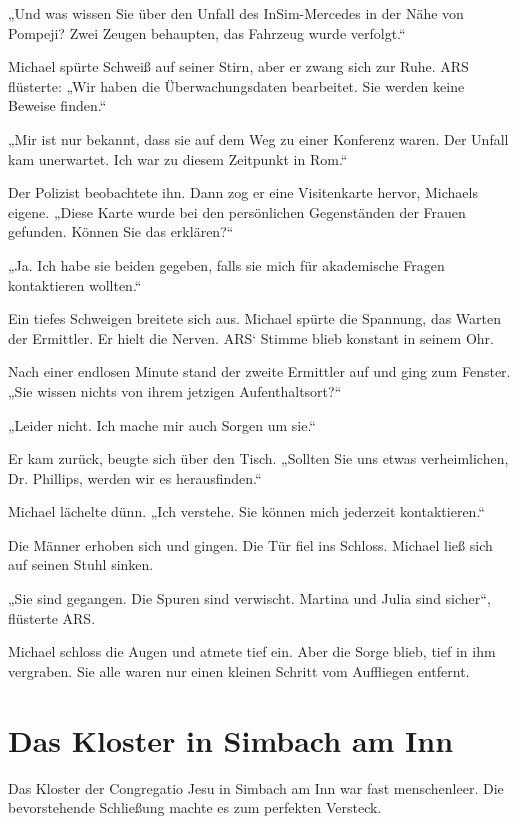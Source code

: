 \documentclass[
]{article}
\begin{document}
„Und was wissen Sie über den Unfall des InSim-Mercedes in der Nähe von Pompeji? Zwei Zeugen behaupten, das Fahrzeug wurde verfolgt.``

Michael spürte Schweiß auf seiner Stirn, aber er zwang sich zur Ruhe. ARS flüsterte: „Wir haben die Überwachungsdaten bearbeitet. Sie werden keine Beweise finden.``

„Mir ist nur bekannt, dass sie auf dem Weg zu einer Konferenz waren. Der Unfall kam unerwartet. Ich war zu diesem Zeitpunkt in Rom.``

Der Polizist beobachtete ihn. Dann zog er eine Visitenkarte hervor, Michaels eigene. „Diese Karte wurde bei den persönlichen Gegenständen der Frauen gefunden. Können Sie das erklären?{\kern0pt}``

„Ja. Ich habe sie beiden gegeben, falls sie mich für akademische Fragen kontaktieren wollten.``

Ein tiefes Schweigen breitete sich aus. Michael spürte die Spannung, das Warten der Ermittler. Er hielt die Nerven. ARS` Stimme blieb konstant in seinem Ohr.

Nach einer endlosen Minute stand der zweite Ermittler auf und ging zum Fenster. „Sie wissen nichts von ihrem jetzigen Aufenthaltsort?{\kern0pt}``

„Leider nicht. Ich mache mir auch Sorgen um sie.``

Er kam zurück, beugte sich über den Tisch. „Sollten Sie uns etwas verheimlichen, Dr. Phillips, werden wir es herausfinden.``

Michael lächelte dünn. „Ich verstehe. Sie können mich jederzeit kontaktieren.``

Die Männer erhoben sich und gingen. Die Tür fiel ins Schloss. Michael ließ sich auf seinen Stuhl sinken.

„Sie sind gegangen. Die Spuren sind verwischt. Martina und Julia sind sicher``, flüsterte ARS.

Michael schloss die Augen und atmete tief ein. Aber die Sorge blieb, tief in ihm vergraben. Sie alle waren nur einen kleinen Schritt vom Auffliegen entfernt.

\section{Das Kloster in Simbach am Inn}\label{das-kloster-in-simbach-am-inn}

Das Kloster der Congregatio Jesu in Simbach am Inn war fast menschenleer. Die bevorstehende Schließung machte es zum perfekten Versteck.
\end{document}
